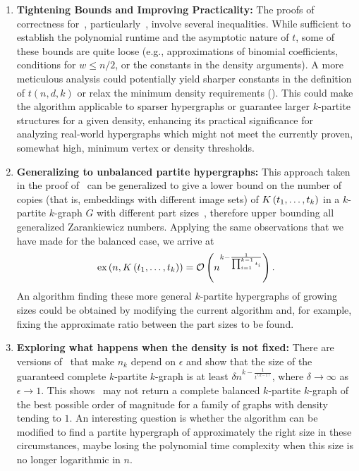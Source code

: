 \begin{enumerate}
    \item \textbf{Tightening Bounds and Improving Practicality:}
    The proofs of correctness for~, particularly~,
    involve several inequalities.
    While sufficient to establish the polynomial runtime and the asymptotic nature of $t$,
    some of these bounds are quite loose (e.g., approximations of binomial coefficients, conditions for $w \leq n/2$,
    or the constants in the density arguments).
    A more meticulous analysis could potentially yield sharper constants in the definition of
    $t(n,d,k)$ or relax the minimum density requirements ().
    This could make the algorithm applicable to sparser hypergraphs or guarantee larger $k$-partite structures for a given density,
    enhancing its practical significance for analyzing real-world hypergraphs which might not meet the currently proven,
    somewhat high, minimum vertex or density thresholds.

    \item \textbf{Generalizing to unbalanced partite hypergraphs:}
    This approach taken in the proof of~
    can be generalized to give a lower bound on the number of
    copies (that is, embeddings with different image sets)
    of $K\left(t_1, \dots, t_k\right)$ in a $k$-partite $k$-graph $G$
    with different part sizes~\cite{carvajal2024canonical},
    therefore upper bounding all generalized Zarankiewicz numbers.
    Applying the same observations that we have made for the balanced case,
    we arrive at
    \begin{equation} \label{eq:general-partite-bound}
        \text{ex} \left( n, K\left(t_1, \dots, t_k\right) \right) = \mathcal{O}\left(n^{k - \frac{1}{\prod_{i=1}^{k-1} t_i}}\right).
    \end{equation}
    An algorithm finding these more general $k$-partite hypergraphs
    of growing sizes could be obtained by modifying the current algorithm
    and, for example, fixing the approximate ratio between the part sizes to be found.

    \item \textbf{Exploring what happens when the density is not fixed:}
    There are versions of~
    that make $n_k$ depend on $\epsilon$ and show that the size of the
    guaranteed complete $k$-partite $k$-graph is at least $\delta n^{k-\frac{1}{t^{(k-1)}}}$,
    where $\delta \to \infty$ as $\epsilon \to 1$.
    This shows~ may not return a complete balanced $k$-partite
    $k$-graph of the best possible order of magnitude for a family of graphs with density tending to $1$.
    An interesting question is whether the algorithm can be modified to find
    a partite hypergraph of approximately the right size in these circumstances,
    maybe losing the polynomial time complexity when this size is no longer logarithmic in $n$.


\end{enumerate}
